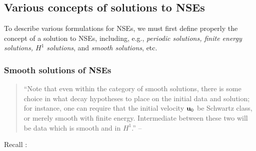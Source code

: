 \documentclass{article}
\numberwithin{equation}{section}
\begin{document}
\subsection{Various concepts of solutions to NSEs}
To describe various formulations for NSEs, we must first define properly the concept of a solution to NSEs, including, e.g., \textit{periodic solutions, finite energy solutions, $H^1$ solutions}, and \textit{smooth solutions}, etc.

\subsubsection{Smooth solutions of NSEs}
\begin{quotation}
	``Note that even within the category of smooth solutions, there is some choice in what decay hypotheses to place on the initial data and solution; for instance, one can require that the initial velocity ${\bf u}_0$ be Schwartz class, or merely smooth with finite energy. Intermediate between these two will be data which is smooth and in $H^1$.'' -- \cite{Tao2013}
\end{quotation}
Recall \cite[Def. 1.1]{Tao2013}:
\end{document}
